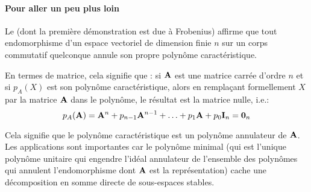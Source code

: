 \medskip
{}
\paragraph{Pour aller un peu plus loin}
Le 
(dont la première démonstration est due à Frobenius)
affirme que tout endomorphisme d'un espace vectoriel de dimension finie $n$ sur un corps commutatif quelconque
annule son propre polynôme caractéristique.

En termes de matrice, cela signifie que : si $\MM{A}$ est une matrice carrée d'ordre $n$ et si
$p_A(X)$ est son polynôme caractéristique, alors en remplaçant formellement
$X$ par la matrice $\MM{A}$ dans le polynôme, le résultat est la matrice nulle, i.e.:
\begin{equation}p_A(\MM{A})= \MM{A}^n + p_{n-1}\MM{A}^{n-1} + \ldots + p_1 \MM{A} + p_0 \MM{I}_n = \MM{0}_n \end{equation}

Cela signifie que le polynôme caractéristique est un
polynôme annulateur de $\MM{A}$.
Les applications sont importantes car le polynôme minimal (qui est l'unique polynôme unitaire qui
engendre l'idéal annulateur de l'ensemble des polynômes qui annulent l'endomorphisme dont $\MM{A}$
est la représentation) cache une décomposition en somme  directe de sous-espaces stables.










\medskip
